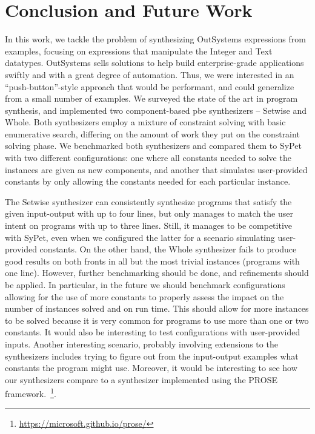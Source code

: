 \chapter{Conclusion and Future Work}
\label{chap:conclusion}

In this work, we tackle the problem of synthesizing OutSystems expressions from
examples, focusing on expressions that manipulate the Integer and Text
datatypes.
OutSystems sells solutions to help build enterprise-grade applications swiftly
and with a great degree of automation.
Thus, we were interested in an ``push-button''-style approach that would be
performant, and could generalize from a small number of examples.
We surveyed the state of the art in program synthesis, and implemented two
component-based \gls{pbe} synthesizers -- Setwise and Whole.
Both synthesizers employ a mixture of constraint solving with basic enumerative
search, differing on the amount of work they put on the constraint solving
phase.
We benchmarked both synthesizers and compared them to SyPet~\cite{Feng:2017:CSC}
with two different configurations: one where all constants needed to solve the
instances are given as new components, and another that simulates
user-provided constants by only allowing the constants needed for each
particular instance.

The Setwise synthesizer can consistently synthesize programs that satisfy the
given input-output with up to four lines, but only manages to match the user
intent on programs with up to three lines.
Still, it manages to be competitive with SyPet, even when we configured the
latter for a scenario simulating user-provided constants.
On the other hand, the Whole synthesizer fails to produce good results on both
fronts in all but the most trivial instances (programs with one line).
However, further benchmarking should be done, and refinements should be applied.
In particular, in the future we should benchmark configurations allowing for the
use of more constants to properly assess the impact on the number of instances
solved and on run time.
This should allow for more instances to be solved because it is very common for
programs to use more than one or two constants.
It would also be interesting to test configurations with user-provided inputs.
Another interesting scenario, probably involving extensions to the synthesizers
includes trying to figure out from the input-output examples what constants the
program might use.
Moreover, it would be interesting to see how our synthesizers compare to a
synthesizer implemented using the PROSE
framework.~\footnote{\url{https://microsoft.github.io/prose/}}.

